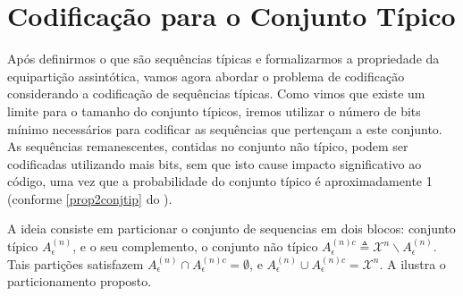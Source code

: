 \section{Codificação para o Conjunto Típico}

Após definirmos o que são sequências típicas e formalizarmos a propriedade da
equipartição assintótica, vamos agora abordar o problema de codificação
considerando a codificação de sequências típicas.  Como vimos que existe um
limite para o tamanho do conjunto típicos, iremos utilizar o número de bits
mínimo necessários para codificar as sequências que pertençam a este conjunto.
As sequências remanescentes, contidas no conjunto não típico, podem ser
codificadas utilizando mais bits, sem que isto cause impacto significativo ao
código, uma vez que a probabilidade do conjunto típico é aproximadamente 1
(conforme \cref{prop2conjtip} do ).

A ideia consiste em particionar o conjunto de sequencias em dois blocos:
conjunto típico $A_\epsilon^{(n)}$, e o seu complemento, o conjunto não típico 
$A_\epsilon^{(n)c} \triangleq \mathcal{X}^n \backslash A_\epsilon^{(n)}$.
Tais partições satisfazem $A_\epsilon^{(n)} \cap A_\epsilon^{(n)c} = \emptyset$, 
e $A_\epsilon^{(n)} \cup A_\epsilon^{(n)c} = \mathcal{X}^n$. A 
ilustra o particionamento proposto.


\begin{marginfigure}%
\caption{Particionamento de $\mathcal{X}^n$ em dois conjuntos: $A_\epsilon^{(n)}$ e $A_\epsilon^{(n)c}$.}
\label{fig:particao2}
\end{marginfigure}



